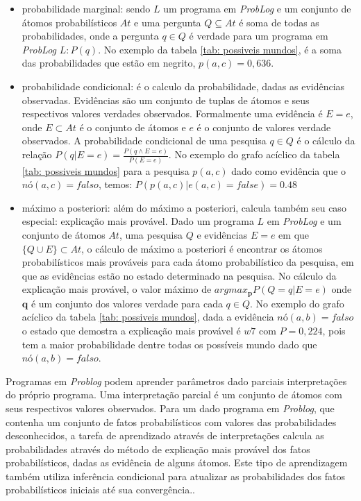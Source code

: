 \documentclass[
	12pt,				%
    oneside,			%
	a4paper,			%
	english,			%
	french,				%
	spanish,			%
	brazil,				%
	]{abntex2}
\begin{document}
\begin{itemize}
    \item probabilidade marginal: sendo $L$ um programa em \textit{ProbLog} e um conjunto de átomos probabilísticos $At$ e uma pergunta $Q \subseteq At$ é soma de todas as probabilidades, onde a pergunta $q \in Q$ é verdade para um programa em \textit{ProbLog} $L: P(q)$. No exemplo da tabela \ref{tab: possiveis mundos}, é a soma das probabilidades que estão em negrito, $p(a, c)=0,636$.
    
    \item probabilidade condicional: é o calculo da probabilidade, dadas as evidências observadas. Evidências são um conjunto de tuplas de átomos e seus respectivos valores verdades observados. Formalmente uma evidência é $E=e$, onde $E \subset At$ é o conjunto de átomos e $e$ é o conjunto de valores verdade observados. A probabilidade condicional de uma pesquisa $q \in Q$ é o cálculo da relação \(P(q|E=e)=\frac{P(q\wedge E=e)}{P(E=e)}\). No exemplo do grafo acíclico da tabela \ref{tab: possiveis mundos} para a pesquisa $p(a,c)$ dado como evidência que o $nó(a,c)=falso$, temos: $P(p(a, c)|e(a, c) = false) =0.48$ 
    
    \item máximo a posteriori: além do máximo a posteriori, calcula também seu caso especial: explicação mais provável. Dado um programa $L$ em \textit{ProbLog} e um conjunto de átomos $At$, uma pesquisa $Q$ e evidências $E=e$ em que $\{Q \cup E\}\subset At$, o cálculo de máximo a posteriori é encontrar os átomos probabilísticos mais prováveis para cada átomo probabilístico da pesquisa, em que as evidências estão no estado determinado na pesquisa. No cálculo da explicação mais provável, o valor máximo de $argmax_\textbf{p}P(Q=q|E=e)$ onde $\textbf{q}$ é um conjunto dos valores verdade para cada $q\in Q$. No exemplo do grafo acíclico da tabela \ref{tab: possiveis mundos}, dada a evidência $nó(a,b)= falso$ o estado que demostra a explicação mais provável é $w7$ com $P=0,224$, pois tem a maior probabilidade dentre todas os possíveis mundo dado que $nó(a,b)= falso$.
    
\end{itemize} 

Programas em \textit{Problog} podem aprender parâmetros dado parciais interpretações do próprio programa. Uma interpretação parcial é um conjunto de átomos com seus respectivos valores observados. Para um dado programa em \textit{Problog}, que contenha um conjunto de fatos probabilísticos com valores das probabilidades desconhecidos, a tarefa de aprendizado através de interpretações calcula as probabilidades através do método de explicação mais provável dos fatos probabilísticos, dadas as evidência de alguns átomos. Este tipo de aprendizagem também utiliza inferência condicional para atualizar as probabilidades dos fatos probabilísticos iniciais até sua convergência..
\end{document}
